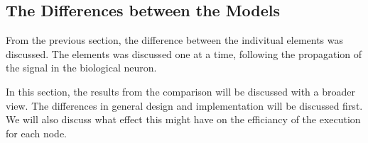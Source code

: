 %


%
%
%
%
%

%



		\subsection{The Differences between the Models} %
		From the previous section, the difference between the indivitual elements was discussed. 
		The elements was discussed one at a time, following the propagation of the signal in the biological neuron.

		In this section, the results from the comparison will be discussed with a broader view.
		The differences in general design and implementation will be discussed first.
		We will also discuss what effect this might have on the efficiancy of the execution for each node.


